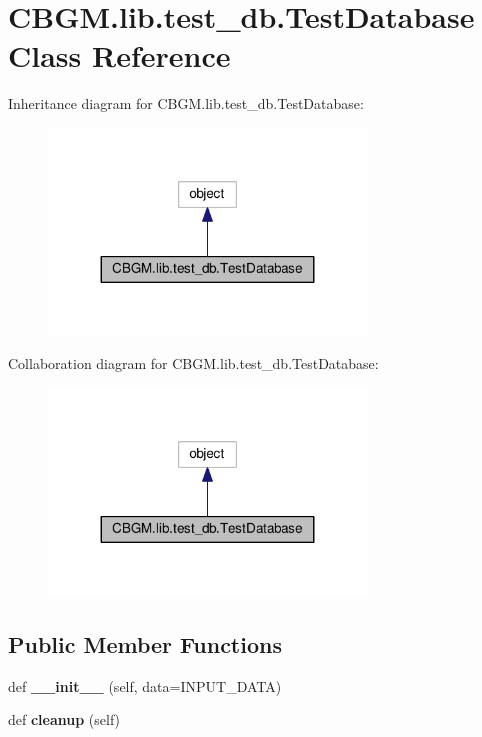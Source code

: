 \hypertarget{classCBGM_1_1lib_1_1test__db_1_1TestDatabase}{}\section{C\+B\+G\+M.\+lib.\+test\+\_\+db.\+Test\+Database Class Reference}
\label{classCBGM_1_1lib_1_1test__db_1_1TestDatabase}


Inheritance diagram for C\+B\+G\+M.\+lib.\+test\+\_\+db.\+Test\+Database\+:\nopagebreak
\begin{figure}[H]
\begin{center}
\leavevmode
\includegraphics[width=239pt]{classCBGM_1_1lib_1_1test__db_1_1TestDatabase__inherit__graph}
\end{center}
\end{figure}


Collaboration diagram for C\+B\+G\+M.\+lib.\+test\+\_\+db.\+Test\+Database\+:\nopagebreak
\begin{figure}[H]
\begin{center}
\leavevmode
\includegraphics[width=239pt]{classCBGM_1_1lib_1_1test__db_1_1TestDatabase__coll__graph}
\end{center}
\end{figure}
\subsection*{Public Member Functions}
\begin{DoxyCompactItemize}
\item 
\mbox{\label{classCBGM_1_1lib_1_1test__db_1_1TestDatabase_a5d9c034ab7f40291e3ec58a73fcbc8fe}} 
def {\bfseries \+\_\+\+\_\+init\+\_\+\+\_\+} (self, data=I\+N\+P\+U\+T\+\_\+\+D\+A\+TA)
\item 
\mbox{\label{classCBGM_1_1lib_1_1test__db_1_1TestDatabase_a28ea5e2bd5637fbc4fd5956045ffdb83}} 
def {\bfseries cleanup} (self)
\end{DoxyCompactItemize}
